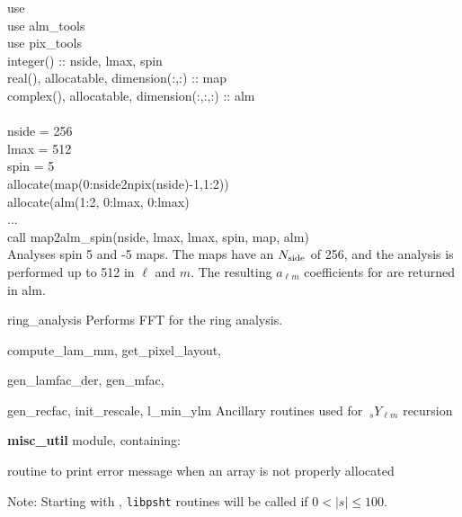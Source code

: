 \begin{example}
{
use \\
use alm\_tools\\
use pix\_tools\\
integer() :: nside, lmax, spin \\
real(), allocatable, dimension(:,:) :: map \\
complex(), allocatable, dimension(:,:,:) :: alm \\
\\
nside = 256 \\
lmax = 512 \\
spin = 5 \\
allocate(map(0:nside2npix(nside)-1,1:2)) \\
allocate(alm(1:2, 0:lmax, 0:lmax)\\
...\\
call map2alm\_spin(nside, lmax, lmax, spin, map, alm)  \\
}
{
Analyses spin 5 and -5 maps. The maps have
an $N_\mathrm{side}$ of 256, and the analysis is performed up
to 512 in $\ell$ and $m$. The resulting $a_{\ell m}$ coefficients for
are returned in alm.
}
\end{example}

\begin{modules}
  \begin{sulist}{} %
  \item[ring\_analysis] Performs FFT for the ring analysis.
  \item[compute\_lam\_mm, get\_pixel\_layout, ]
  \item[gen\_lamfac\_der, gen\_mfac,  ] 
  \item[gen\_recfac, init\_rescale, l\_min\_ylm] Ancillary routines used
  for $\ {_s}Y_{\ell m}$ recursion
  \item[\textbf{misc\_util}] module, containing:
  \item[\htmlref{assert\_alloc}{sub:assert}] routine to print error message when an array is not
  properly allocated		
  \end{sulist}
Note: Starting with , {\tt libpsht} routines will be called if $0<|s|\le100$.
\end{modules}

